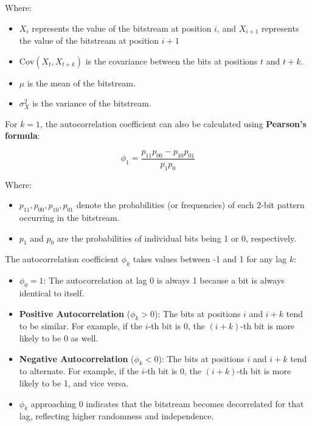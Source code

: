 Where:
\begin{itemize}
    \item \( X_i \) represents the value of the bitstream at position \( i \), and \( X_{i+1} \) represents the value of the bitstream at position \( i+1 \)
    \item \( \text{Cov}(X_t, X_{t+k}) \) is the covariance between the bits at positions \( t \) and \( t+k \).
    \item \( \mu \) is the mean of the bitstream.
    \item \( \sigma_X^2 \) is the variance of the bitstream.
\end{itemize}

For \( k=1 \), the autocorrelation coefficient can also be calculated using \textbf{Pearson’s formula}:

\begin{equation}
\phi_1 = \frac{p_{11} p_{00} - p_{10} p_{01}}{p_1 p_0}
\end{equation}

Where:
\begin{itemize}
    \item \( p_{11}, p_{00}, p_{10}, p_{01} \) denote the probabilities (or frequencies) of each 2-bit pattern occurring in the bitstream.
    \item \( p_1 \) and \( p_0 \) are the probabilities of individual bits being 1 or 0, respectively.
\end{itemize}

The autocorrelation coefficient \( \phi_k \) takes values between -1 and 1 for any lag \( k \):
\begin{itemize}
    \item \( \phi_0 = 1 \): The autocorrelation at lag 0 is always 1 because a bit is always identical to itself.
    \item \textbf{Positive Autocorrelation} (\( \phi_k > 0 \)): The bits at positions \( i \) and \( i+k \) tend to be similar. For example, if the \( i \)-th bit is 0, the \( (i+k) \)-th bit is more likely to be 0 as well.
    \item \textbf{Negative Autocorrelation} (\( \phi_k < 0 \)): The bits at positions \( i \) and \( i+k \) tend to alternate. For example, if the \( i \)-th bit is 0, the \( (i+k) \)-th bit is more likely to be 1, and vice versa.
    \item \( \phi_k \) approaching 0 indicates that the bitstream becomes decorrelated for that lag, reflecting higher randomness and independence.
\end{itemize}

